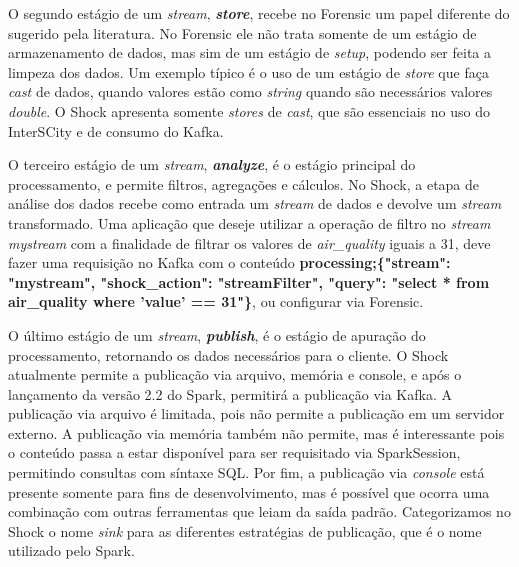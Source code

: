 O segundo estágio de um \textit{stream}, \textit{\textbf{store}}, recebe no
Forensic um papel diferente do sugerido pela literatura. No Forensic
ele não trata somente de um estágio de armazenamento de dados, mas sim de um
estágio de \textit{setup}, podendo ser feita a limpeza dos dados. Um
exemplo típico é o uso de um estágio de \textit{store} que faça \textit{cast}
de dados, quando valores estão como \textit{string} quando são necessários valores
\textit{double}. O Shock apresenta somente \textit{stores} de \textit{cast},
que são essenciais no uso do InterSCity e de consumo do Kafka.



O terceiro estágio de um \textit{stream}, \textit{\textbf{analyze}}, é o
estágio principal do processamento, e permite filtros, agregações e cálculos.
No Shock, a etapa de análise dos dados recebe como entrada um \textit{stream}
de dados e devolve um \textit{stream} transformado. Uma aplicação que deseje
utilizar a operação de filtro no \textit{stream} \textit{mystream} com a finalidade
de filtrar os valores de \textit{air\_quality} iguais a 31, deve fazer uma
requisição no Kafka com o conteúdo \small{\textbf{processing;\{"stream": "mystream",
"shock\_action": "streamFilter", "query": "select * from air\_quality where
'value' == 31"\}}}, ou configurar via Forensic.



O último estágio de um \textit{stream}, \textit{\textbf{publish}}, é o estágio
de apuração do processamento, retornando os dados necessários para o cliente.
O Shock atualmente permite a publicação via arquivo, memória e console, e após o
lançamento da versão 2.2 do Spark, permitirá a publicação via Kafka. A
publicação via arquivo é limitada, pois não permite a publicação em um servidor
externo. A publicação via memória também não permite, mas é interessante pois
o conteúdo passa a estar disponível para ser requisitado via SparkSession,
permitindo consultas com síntaxe SQL. Por fim, a publicação via \textit{console} está
presente somente para fins de desenvolvimento, mas é possível que ocorra uma
combinação com outras ferramentas que leiam da saída padrão. Categorizamos
no Shock o nome \textit{sink} para as diferentes estratégias de publicação,
que é o nome utilizado pelo Spark.

